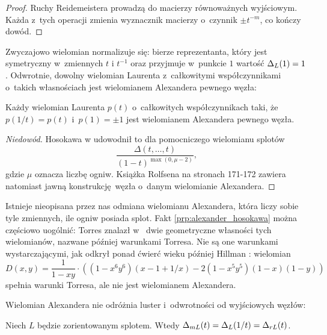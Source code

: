 \begin{proof}
    Ruchy Reidemeistera prowadzą do macierzy równoważnych wyjściowym.
    Każda z~tych operacji zmienia wyznacznik macierzy o~czynnik $\pm t^{-m}$, co kończy dowód.
\end{proof}

Zwyczajowo wielomian normalizuje się: bierze reprezentanta, który jest symetryczny w~zmiennych $t$ i $t^{-1}$ oraz przyjmuje w~punkcie $1$ wartość $\Delta_L(1) = 1$.
Odwrotnie, dowolny wielomian Laurenta z~całkowitymi współczynnikami o~takich własnościach jest wielomianem Alexandera pewnego węzła:

\begin{proposition}
    \label{prp:alexander_hosokawa}
    Każdy wielomian Laurenta $p(t)$ o~całkowitych współczynnikach taki, że $p(1/t) = p(t)$ i~$p(1) = \pm 1$ jest wielomianem Alexandera pewnego węzła.
\end{proposition}

\begin{proof}[Niedowód]
    Hosokawa w \cite{hosokawa58} udowodnił to dla pomocniczego wielomianu splotów
    \begin{equation}
        \frac{\Delta(t, \ldots, t)}{(1-t)^{\max(0, \mu - 2)}},
    \end{equation}
    gdzie $\mu$ oznacza liczbę ogniw.
    Książka \cite{rolfsen76} Rolfsena na stronach 171-172 zawiera natomiast jawną konstrukcję węzła o~danym wielomianie Alexandera.
\end{proof}

Istnieje nieopisana przez nas odmiana wielomianu Alexandera, która liczy sobie tyle zmiennych, ile ogniw posiada splot.
Fakt \ref{prp:alexander_hosokawa} można częściowo uogólnić: Torres znalazł w~\cite{torres53} dwie geometryczne własności tych wielomianów, nazwane później warunkami Torresa.
Nie są one warunkami wystarczającymi, jak odkrył ponad ćwierć wieku później Hillman \cite{hillman81}: wielomian
\begin{equation}
    D(x,y) = \frac{1}{1-xy} \cdot \left((1 - x^6y^6)(x - 1 + 1/x) - 2(1 - x^5y^5)(1 - x)(1 - y)\right)
\end{equation}
spełnia warunki Torresa, ale nie jest wielomianem Alexandera.

Wielomian Alexandera nie odróżnia luster i~odwrotności od wyjściowych węzłów:

\begin{proposition}
    Niech $L$ będzie zorientowanym splotem.
    Wtedy $\Delta_{mL}(t) = \Delta_L(1/t) = \Delta_{rL}(t)$.
\end{proposition}

